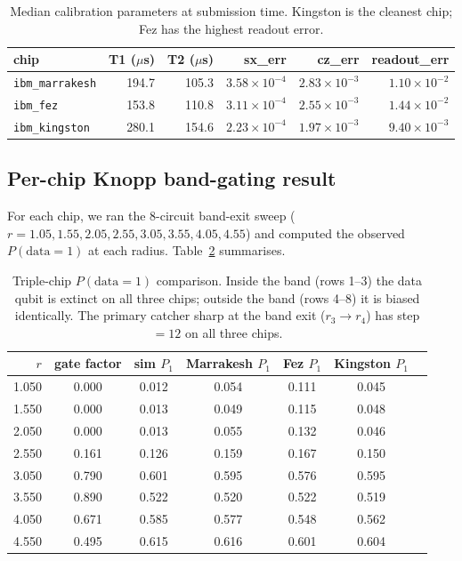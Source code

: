 \documentclass[11pt,a4paper]{article}
\begin{document}
\begin{table}[h]
\centering
\begin{tabular}{lrrrrr}
\toprule
chip & T1 ($\mu$s) & T2 ($\mu$s) & sx\_err & cz\_err & readout\_err \\
\midrule
\texttt{ibm\_marrakesh} & 194.7 & 105.3 & $3.58\times 10^{-4}$ & $2.83\times 10^{-3}$ & $1.10\times 10^{-2}$ \\
\texttt{ibm\_fez}       & 153.8 & 110.8 & $3.11\times 10^{-4}$ & $2.55\times 10^{-3}$ & $1.44\times 10^{-2}$ \\
\texttt{ibm\_kingston}  & 280.1 & 154.6 & $2.23\times 10^{-4}$ & $1.97\times 10^{-3}$ & $9.40\times 10^{-3}$ \\
\bottomrule
\end{tabular}
\caption{Median calibration parameters at submission time. Kingston is the cleanest chip; Fez has the highest readout error.}\label{tab:calib}
\end{table}

\subsection{Per-chip Knopp band-gating result}

For each chip, we ran the 8-circuit band-exit sweep ($r = 1.05, 1.55, 2.05, 2.55, 3.05, 3.55, 4.05, 4.55$) and computed the observed $P(\mathrm{data}=1)$ at each radius. Table~\ref{tab:hw_triple} summarises.

\begin{table}[h]
\centering
\begin{tabular}{rcccccc}
\toprule
$r$ & gate factor & sim $P_{1}$ & Marrakesh $P_{1}$ & Fez $P_{1}$ & Kingston $P_{1}$ \\
\midrule
1.050 & 0.000 & 0.012 & 0.054 & 0.111 & 0.045 \\
1.550 & 0.000 & 0.013 & 0.049 & 0.115 & 0.048 \\
2.050 & 0.000 & 0.013 & 0.055 & 0.132 & 0.046 \\
2.550 & 0.161 & 0.126 & 0.159 & 0.167 & 0.150 \\
3.050 & 0.790 & 0.601 & 0.595 & 0.576 & 0.595 \\
3.550 & 0.890 & 0.522 & 0.520 & 0.522 & 0.519 \\
4.050 & 0.671 & 0.585 & 0.577 & 0.548 & 0.562 \\
4.550 & 0.495 & 0.615 & 0.616 & 0.601 & 0.604 \\
\bottomrule
\end{tabular}
\caption{Triple-chip $P(\mathrm{data}=1)$ comparison. Inside the band (rows 1--3) the data qubit is extinct on all three chips; outside the band (rows 4--8) it is biased identically. The primary catcher sharp at the band exit ($r_{3}\to r_{4}$) has step $= 12$ on all three chips.}\label{tab:hw_triple}
\end{table}
\end{document}
